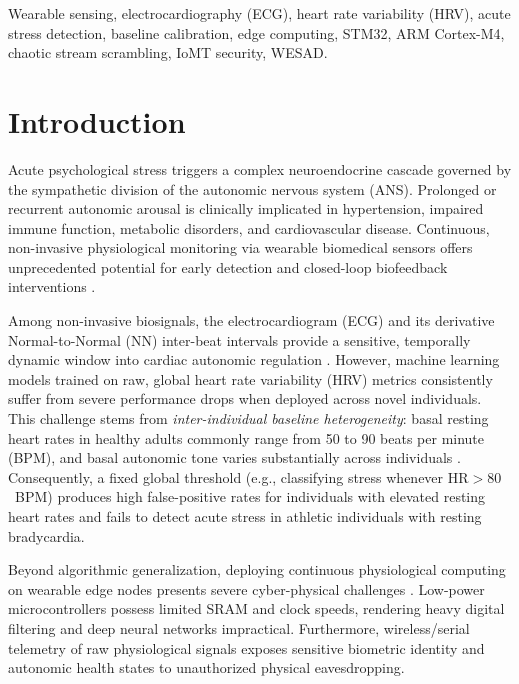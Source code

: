 \documentclass[conference]{IEEEtran}
\begin{document}
\begin{abstract}
reliability) across authorized monitoring and adversarial eavesdropper operating modes.
\end{abstract}

\begin{IEEEkeywords}
Wearable sensing, electrocardiography (ECG), heart rate variability (HRV), acute stress detection, baseline calibration, edge computing, STM32, ARM Cortex-M4, chaotic stream scrambling, IoMT security, WESAD.
\end{IEEEkeywords}

\section{Introduction}
Acute psychological stress triggers a complex neuroendocrine cascade governed by the sympathetic division of the autonomic nervous system (ANS). Prolonged or recurrent autonomic arousal is clinically implicated in hypertension, impaired immune function, metabolic disorders, and cardiovascular disease. Continuous, non-invasive physiological monitoring via wearable biomedical sensors offers unprecedented potential for early detection and closed-loop biofeedback interventions \cite{can2019continuous}.

Among non-invasive biosignals, the electrocardiogram (ECG) and its derivative Normal-to-Normal (NN) inter-beat intervals provide a sensitive, temporally dynamic window into cardiac autonomic regulation \cite{taskforce1996hrv}. However, machine learning models trained on raw, global heart rate variability (HRV) metrics consistently suffer from severe performance drops when deployed across novel individuals. This challenge stems from \textit{inter-individual baseline heterogeneity}: basal resting heart rates in healthy adults commonly range from 50 to 90 beats per minute (BPM), and basal autonomic tone varies substantially across individuals \cite{taskforce1996hrv, shaffer2017overview}. Consequently, a fixed global threshold (e.g., classifying stress whenever $\text{HR} > 80$~BPM) produces high false-positive rates for individuals with elevated resting heart rates and fails to detect acute stress in athletic individuals with resting bradycardia.

Beyond algorithmic generalization, deploying continuous physiological computing on wearable edge nodes presents severe cyber-physical challenges \cite{alturjman2020iomt, sugita2015mental}. Low-power microcontrollers possess limited SRAM and clock speeds, rendering heavy digital filtering and deep neural networks impractical. Furthermore, wireless/serial telemetry of raw physiological signals exposes sensitive biometric identity and autonomic health states to unauthorized physical eavesdropping.
\end{document}
